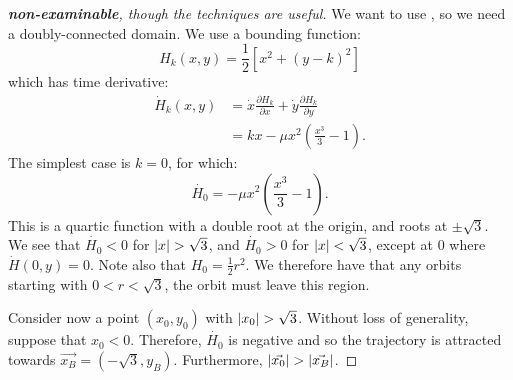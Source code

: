 \documentclass[../Main.tex]{subfiles}
\begin{document}
\begin{proof}[\textbf{non-examinable}, though the techniques are useful]
    We want to use , so we need a doubly-connected domain. We use a bounding function:
    \begin{equation*}
        H_k(x, y) = \frac12\left[x^2 + (y-k)^2\right]
    \end{equation*}
    which has time derivative:
    \begin{align*}
        \dot{H}_k(x, y) &= \dot{x} \frac{\partial H_k}{\partial x} + \dot{y} \frac{\partial H_k}{\partial y} \\
        &= kx - \mu x^2 \left(\frac{x^3}{3} - 1\right).
    \end{align*}
    The simplest case is $k = 0$, for which:
    \begin{equation*}
        \dot{H_0} = -\mu x^2 \left(\frac{x^3}{3} - 1\right).
    \end{equation*}
    This is a quartic function with a double root at the origin, and roots at $\pm \sqrt{3}$. We see that $\dot{H_0} < 0$ for $\left|x\right| > \sqrt{3}$, and $\dot{H_0} > 0$ for $\left|x\right| < \sqrt{3}$, except at $0$ where $\dot{H}(0, y) = 0$. Note also that $H_0 = \frac12 r^2$. We therefore have that any orbits starting with $0 < r < \sqrt{3}$, the orbit must leave this region.

    Consider now a point $(x_0, y_0)$ with $\left|x_0\right| > \sqrt{3}$. Without loss of generality, suppose that $x_0 < 0$. Therefore, $\dot{H_0}$ is negative and so the trajectory is attracted towards $\vec{x_B} = (-\sqrt{3}, y_B)$. Furthermore, $\left|\vec{x_0}\right| > \left|\vec{x_B}\right|$.


\end{proof}
\end{document}

